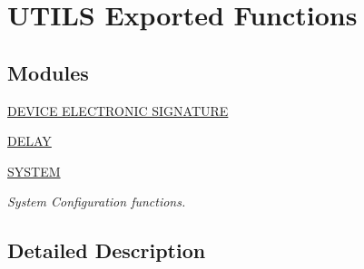 \hypertarget{group___u_t_i_l_s___l_l___exported___functions}{}\section{U\+T\+I\+LS Exported Functions}
\label{group___u_t_i_l_s___l_l___exported___functions}
\subsection*{Modules}
\begin{DoxyCompactItemize}
\item 
\hyperlink{group___u_t_i_l_s___e_f___d_e_v_i_c_e___e_l_e_c_t_r_o_n_i_c___s_i_g_n_a_t_u_r_e}{D\+E\+V\+I\+C\+E E\+L\+E\+C\+T\+R\+O\+N\+I\+C S\+I\+G\+N\+A\+T\+U\+RE}
\item 
\hyperlink{group___u_t_i_l_s___l_l___e_f___d_e_l_a_y}{D\+E\+L\+AY}
\item 
\hyperlink{group___u_t_i_l_s___e_f___s_y_s_t_e_m}{S\+Y\+S\+T\+EM}
\begin{DoxyCompactList}\small\item\em System Configuration functions. \end{DoxyCompactList}\end{DoxyCompactItemize}


\subsection{Detailed Description}
